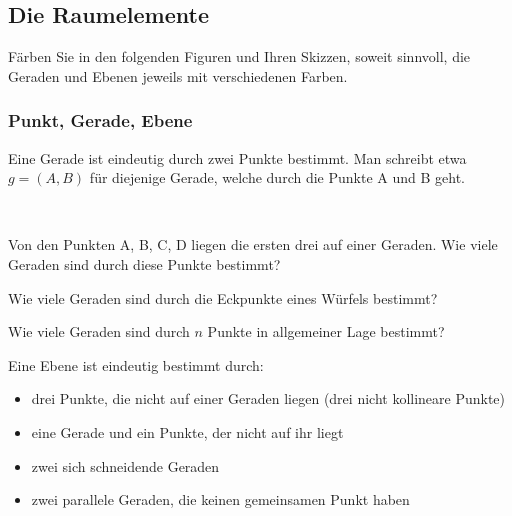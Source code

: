 \documentclass[%
11pt,%
twoside,%
titlepage,%
a4page,%
german,%
headsepline%
]{scrartcl}
\begin{document}
\subsection{Die Raumelemente}
\begin{bem}
F\"arben Sie in den folgenden Figuren und Ihren Skizzen, soweit sinnvoll, die Geraden und Ebenen jeweils mit verschiedenen Farben.
\end{bem}
\subsubsection{Punkt, Gerade, Ebene}
\begin{center}
\end{center}

Eine Gerade ist eindeutig durch zwei Punkte bestimmt. Man schreibt etwa $g=(A,B)$ f\"ur diejenige Gerade, welche durch die Punkte A und B geht.

\begin{ueb} \ \\[-4ex]
\begin{enumeratea}
\item Von den Punkten A, B, C, D liegen die ersten drei auf einer Geraden. Wie viele Geraden sind durch diese Punkte bestimmt?
\item Wie viele Geraden sind durch die Eckpunkte eines W\"urfels bestimmt?
\item Wie viele Geraden sind durch $n$ Punkte in allgemeiner Lage bestimmt?
\end{enumeratea}
\end{ueb}

\noindent Eine Ebene ist eindeutig bestimmt durch:
\begin{itemize}
\item drei Punkte, die nicht auf einer Geraden liegen (drei nicht kollineare Punkte)
\item eine Gerade und ein Punkte, der nicht auf ihr liegt
\item zwei sich schneidende Geraden
\item zwei parallele Geraden, die keinen gemeinsamen Punkt haben
\end{itemize}
\end{document}
